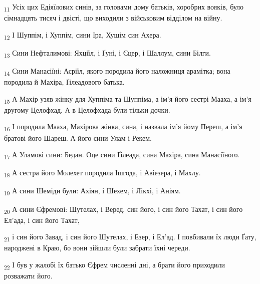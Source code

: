 \begin{tcolorbox}
\textsubscript{11} Усіх цих Едіяїлових синів, за головами дому батьків, хоробрих вояків, було сімнадцять тисяч і двісті, що виходили з військовим відділом на війну.
\end{tcolorbox}
\begin{tcolorbox}
\textsubscript{12} І Шуппім, і Хуппім, сини Іра, Хушім син Ахера.
\end{tcolorbox}
\begin{tcolorbox}
\textsubscript{13} Сини Нефталимові: Яхціїл, і Ґуні, і Єцер, і Шаллум, сини Білги.
\end{tcolorbox}
\begin{tcolorbox}
\textsubscript{14} Сини Манасіїні: Асріїл, якого породила його наложниця арамітка; вона породила й Махіра, Ґілеадового батька.
\end{tcolorbox}
\begin{tcolorbox}
\textsubscript{15} А Махір узяв жінку для Хуппіма та Шуппіма, а ім'я його сестрі Мааха, а ім'я другому Целофхад. А в Целофхада були тільки дочки.
\end{tcolorbox}
\begin{tcolorbox}
\textsubscript{16} І породила Мааха, Махірова жінка, сина, і назвала ім'я йому Переш, а ім'я братові його Шареш. А його сини Улам і Рекем.
\end{tcolorbox}
\begin{tcolorbox}
\textsubscript{17} А Уламові сини: Бедан. Оце сини Ґілеада, сина Махіра, сина Манасіїного.
\end{tcolorbox}
\begin{tcolorbox}
\textsubscript{18} А сестра його Молехет породила Ішгода, і Авіезера, і Махлу.
\end{tcolorbox}
\begin{tcolorbox}
\textsubscript{19} А сини Шеміди були: Ахіян, і Шехем, і Лікхі, і Аніям.
\end{tcolorbox}
\begin{tcolorbox}
\textsubscript{20} А сини Єфремові: Шутелах, і Веред, син його, і син його Тахат, і син його Ел'ада, і син його Тахат,
\end{tcolorbox}
\begin{tcolorbox}
\textsubscript{21} і син його Завад, і син його Шутелах, і Езер, і Ел'ад. І повбивали їх люди Ґату, народжені в Краю, бо вони зійшли були забрати їхні череди.
\end{tcolorbox}
\begin{tcolorbox}
\textsubscript{22} І був у жалобі їх батько Єфрем численні дні, а брати його приходили розважати його.
\end{tcolorbox}
